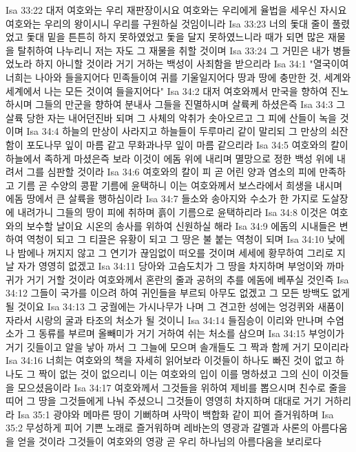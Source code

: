 Isa 33:22  대저 여호와는 우리 재판장이시요 여호와는 우리에게 율법을 세우신 자시요 여호와는 우리의 왕이시니 우리를 구원하실 것임이니라
Isa 33:23  너의 돛대 줄이 풀렸었고 돛대 밑을 튼튼히 하지 못하였었고 돛을 달지 못하였느니라 때가 되면 많은 재물을 탈취하여 나누리니 저는 자도 그 재물을 취할 것이며
Isa 33:24  그 거민은 내가 병들었노라 하지 아니할 것이라 거기 거하는 백성이 사죄함을 받으리라
Isa 34:1  "열국이여 너희는 나아와 들을지어다 민족들이여 귀를 기울일지어다 땅과 땅에 충만한 것, 세계와 세계에서 나는 모든 것이여 들을지어다"
Isa 34:2  대저 여호와께서 만국을 향하여 진노하시며 그들의 만군을 향하여 분내사 그들을 진멸하시며 살륙케 하셨은즉
Isa 34:3  그 살륙 당한 자는 내어던진바 되며 그 사체의 악취가 솟아오르고 그 피에 산들이 녹을 것이며
Isa 34:4  하늘의 만상이 사라지고 하늘들이 두루마리 같이 말리되 그 만상의 쇠잔함이 포도나무 잎이 마름 같고 무화과나무 잎이 마름 같으리라
Isa 34:5  여호와의 칼이 하늘에서 족하게 마셨은즉 보라 이것이 에돔 위에 내리며 멸망으로 정한 백성 위에 내려서 그를 심판할 것이라
Isa 34:6  여호와의 칼이 피 곧 어린 양과 염소의 피에 만족하고 기름 곧 수양의 콩팥 기름에 윤택하니 이는 여호와께서 보스라에서 희생을 내시며 에돔 땅에서 큰 살륙을 행하심이라
Isa 34:7  들소와 송아지와 수소가 한 가지로 도살장에 내려가니 그들의 땅이 피에 취하며 흙이 기름으로 윤택하리라
Isa 34:8  이것은 여호와의 보수할 날이요 시온의 송사를 위하여 신원하실 해라
Isa 34:9  에돔의 시내들은 변하여 역청이 되고 그 티끌은 유황이 되고 그 땅은 불 붙는 역청이 되며
Isa 34:10  낮에나 밤에나 꺼지지 않고 그 연기가 끊임없이 떠오를 것이며 세세에 황무하여 그리로 지날 자가 영영히 없겠고
Isa 34:11  당아와 고슴도치가 그 땅을 차지하며 부엉이와 까마귀가 거기 거할 것이라 여호와께서 혼란의 줄과 공허의 추를 에돔에 베푸실 것인즉
Isa 34:12  그들이 국가를 이으려 하여 귀인들을 부르되 아무도 없겠고 그 모든 방백도 없게 될 것이요
Isa 34:13  그 궁궐에는 가시나무가 나며 그 견고한 성에는 엉겅퀴와 새품이 자라서 시랑의 굴과 타조의 처소가 될 것이니
Isa 34:14  들짐승이 이리와 만나며 수염소가 그 동류를 부르며 올빼미가 거기 거하여 쉬는 처소를 삼으며
Isa 34:15  부엉이가 거기 깃들이고 알을 낳아 까서 그 그늘에 모으며 솔개들도 그 짝과 함께 거기 모이리라
Isa 34:16  너희는 여호와의 책을 자세히 읽어보라 이것들이 하나도 빠진 것이 없고 하나도 그 짝이 없는 것이 없으리니 이는 여호와의 입이 이를 명하셨고 그의 신이 이것들을 모으셨음이라
Isa 34:17  여호와께서 그것들을 위하여 제비를 뽑으시며 친수로 줄을 띠어 그 땅을 그것들에게 나눠 주셨으니 그것들이 영영히 차지하며 대대로 거기 거하리라
Isa 35:1  광야와 메마른 땅이 기뻐하며 사막이 백합화 같이 피어 즐거워하며
Isa 35:2  무성하게 피어 기쁜 노래로 즐거워하며 레바논의 영광과 갈멜과 사론의 아름다움을 얻을 것이라 그것들이 여호와의 영광 곧 우리 하나님의 아름다움을 보리로다
